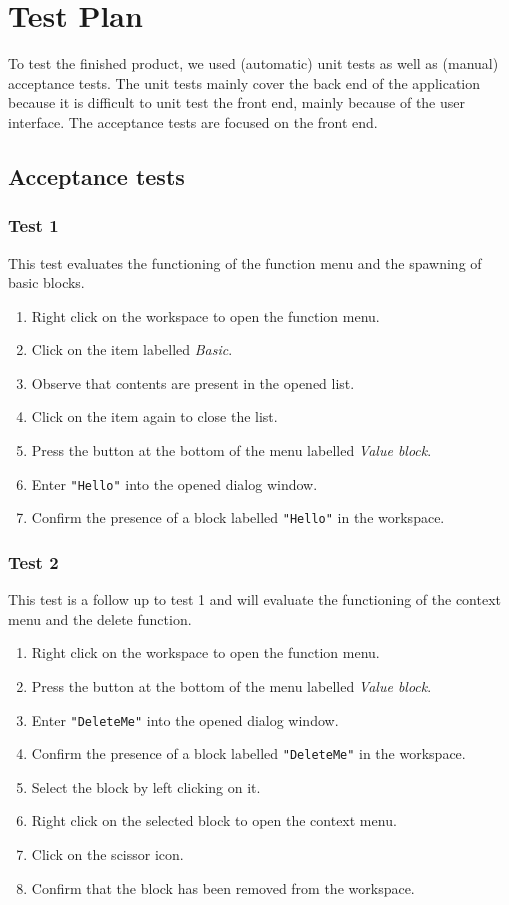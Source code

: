 \chapter{Test Plan}

To test the finished product, we used (automatic) unit tests as well as (manual) acceptance tests.
The unit tests mainly cover the back end of the application because it is difficult to unit test the front end, mainly because of the user interface.
The acceptance tests are focused on the front end.

\section{Acceptance tests} \label{acceptance tests}
	\subsection{Test 1}
		This test evaluates the functioning of the function menu and the spawning of basic blocks.
		
		\begin{enumerate}
			\item Right click on the workspace to open the function menu.
			\item Click on the item labelled \emph{Basic}.
			\item Observe that contents are present in the opened list.
			\item Click on the item again to close the list.
			\item Press the button at the bottom of the menu labelled \emph{Value block}.
			\item Enter \texttt{"Hello"} into the opened dialog window.
			\item Confirm the presence of a block labelled \texttt{"Hello"} in the workspace.
		\end{enumerate}
		
	\subsection{Test 2}
		This test is a follow up to test 1 and will evaluate the functioning of the context menu
		and the delete function.
		
		\begin{enumerate}
			\item Right click on the workspace to open the function menu.
			\item Press the button at the bottom of the menu labelled \emph{Value block}.
			\item Enter \texttt{"DeleteMe"} into the opened dialog window.
			\item Confirm the presence of a block labelled \texttt{"DeleteMe"} in the workspace.
			\item Select the block by left clicking on it.
			\item Right click on the selected block to open the context menu.
			\item Click on the scissor icon.
			\item Confirm that the block has been removed from the workspace.
		\end{enumerate}
		
